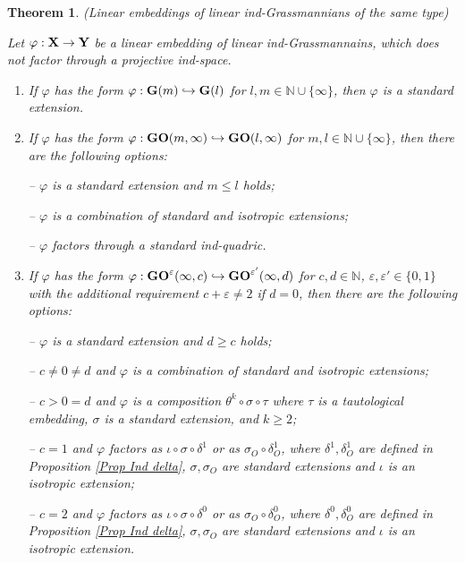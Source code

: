\documentclass[12pt]{amsart}
\def\NN {{\mathbb N}}     %
\def\eps {\varepsilon}
\newtheorem{theorem}{Theorem}[section]
\begin{document}
\begin{theorem}\label{Theo ind Embed Same Type} {\rm (Linear embeddings of linear ind-Grassmannians of the same type)}

Let $\varphi:{\bf X}\to{\bf Y}$ be a linear embedding of linear ind-Grassmannains, which does not factor through a projective ind-space.

\begin{enumerate}
\item[\rm (i)] If $\varphi$ has the form $\varphi:{\bf G}(m) \hookrightarrow {\bf G}(l)$ for $l,m\in\NN\cup\{\infty\}$, then $\varphi$ is a standard extension.

\item[\rm (ii.1)] If $\varphi$ has the form $\varphi:{\bf GO}(m,\infty) \hookrightarrow {\bf GO}(l,\infty)$ for $m,l\in\NN\cup\{\infty\}$, then there are the following options:

-- $\varphi$ is a standard extension and $m\leq l$ holds;

-- $\varphi$ is a combination of standard and isotropic extensions;

-- $\varphi$ factors through a standard ind-quadric.

\item[\rm (ii.2)] If $\varphi$ has the form $\varphi:{\bf GO}^\varepsilon(\infty,c) \hookrightarrow {\bf GO}^{\varepsilon'}(\infty,d)$ for $c,d\in\NN$, $\eps,\eps'\in\{0,1\}$ with the additional requirement $c+\varepsilon\ne2$ if $d=0$, then there are the following options:

-- $\varphi$ is a standard extension and $d\geq c$ holds;

-- $c\ne 0\ne d$ and $\varphi$ is a combination of standard and isotropic extensions;

-- $c>0=d$ and $\varphi$ is a composition $\theta^k\circ\sigma\circ \tau$ where $\tau$ is a tautological embedding, $\sigma$ is a standard extension, and $k\geq 2$;

-- $c=1$ and $\varphi$ factors as $\iota\circ\sigma\circ\delta^1$ or as $\sigma_O\circ \delta^1_O$, where $\delta^1,\delta_O^1$ are defined in Proposition \ref{Prop Ind delta}, $\sigma,\sigma_O$ are standard extensions and $\iota$ is an isotropic extension;

-- $c=2$ and $\varphi$ factors as $\iota\circ\sigma\circ\delta^0$ or as $\sigma_O\circ \delta^0_O$, where $\delta^0,\delta_O^0$ are defined in Proposition \ref{Prop Ind delta}, $\sigma,\sigma_O$ are standard extensions and $\iota$ is an isotropic extension.



\end{enumerate}
\end{theorem}
\end{document}

